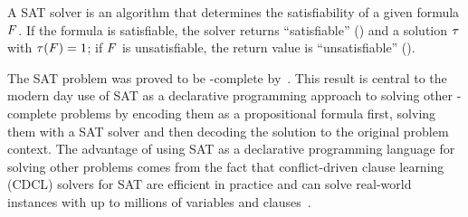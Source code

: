 A SAT solver is an algorithm that determines the satisfiability of a given formula $F$.
If the formula is satisfiable, the solver returns ``satisfiable'' (\sat{}) and a solution $\tau$ with $\tau(F)=1$;
if $F$ is unsatisfiable, the return value is ``unsatisfiable'' (\unsat{}).

The SAT problem was proved to be \NP-complete by~\textcite{DBLP:conf/stoc/Cook71}.
This result is central to the modern day use of SAT as a declarative programming approach to solving other \NP-complete problems by encoding them as a propositional formula first, solving them with a SAT solver and then decoding the solution to the original problem context.
The advantage of using SAT as a declarative programming language for solving other problems comes from the fact that conflict-driven clause learning (CDCL) solvers for SAT are efficient in practice and can solve real-world instances with up to millions of variables and clauses~\autocite{handbook2-cdcl}.

